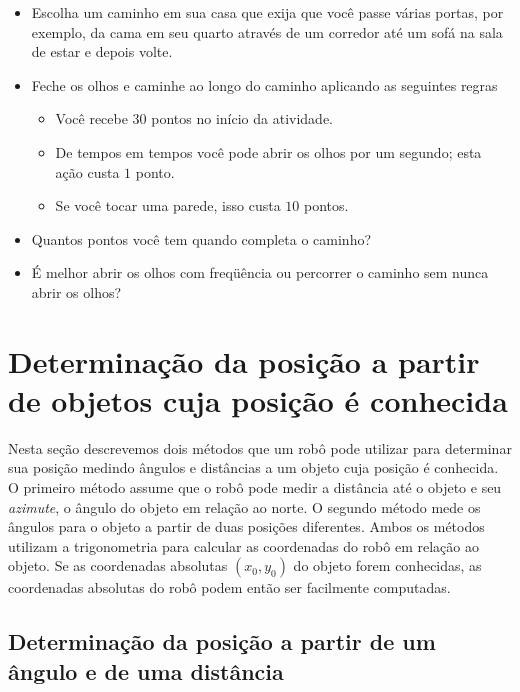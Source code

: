 \begin{framed}
\begin{itemize}
\item Escolha um caminho em sua casa que exija que você passe várias portas, por exemplo, da cama em seu quarto através de um corredor até um sofá na sala de estar e depois volte.
\item Feche os olhos e caminhe ao longo do caminho aplicando as seguintes regras
\begin{itemize}
\item Você recebe $30$ pontos no início da atividade.
\item De tempos em tempos você pode abrir os olhos por um segundo; esta ação custa $1$ ponto.
\item Se você tocar uma parede, isso custa $10$ pontos.
\end{itemize}
\item Quantos pontos você tem quando completa o caminho?
\item É melhor abrir os olhos com freqüência ou percorrer o caminho sem nunca abrir os olhos?
\end{itemize}
\end{framed}

\section[posição a partir de objetos cuja posição é conhecida]{Determinação da posição a partir de objetos cuja posição é conhecida}\label{s.known-points}

Nesta seção descrevemos dois métodos que um robô pode utilizar para determinar sua posição medindo ângulos e distâncias a um objeto cuja posição é conhecida. O primeiro método assume que o robô pode medir a distância até o objeto e seu \emph{azimute}, o ângulo do objeto em relação ao norte. O segundo método mede os ângulos para o objeto a partir de duas posições diferentes. Ambos os métodos utilizam a trigonometria para calcular as coordenadas do robô em relação ao objeto. Se as coordenadas absolutas $(x_0,y_0)$ do objeto forem conhecidas, as coordenadas absolutas do robô podem então ser facilmente computadas.

\subsection{Determinação da posição a partir de um ângulo e de uma distância}

